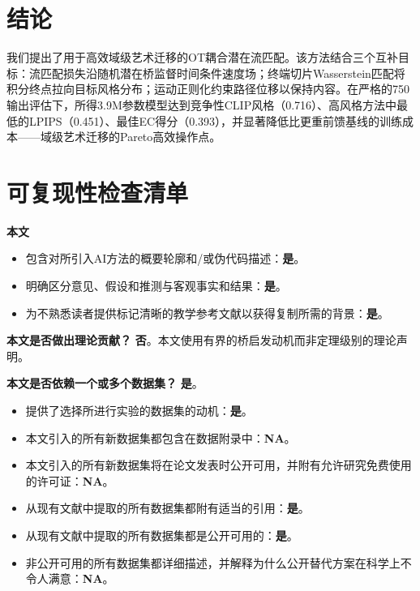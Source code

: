 \documentclass[letterpaper]{article}
\begin{document}
\section{结论}
我们提出了用于高效域级艺术迁移的OT耦合潜在流匹配。该方法结合三个互补目标：流匹配损失沿随机潜在桥监督时间条件速度场；终端切片Wasserstein匹配将积分终点拉向目标风格分布；运动正则化约束路径位移以保持内容。在严格的750输出评估下，所得3.9M参数模型达到竞争性CLIP风格（0.716）、高风格方法中最低的LPIPS（0.451）、最佳EC得分（0.393），并显著降低比更重前馈基线的训练成本——域级艺术迁移的Pareto高效操作点。

\FloatBarrier


\clearpage
\small
\setlength{\itemsep}{1pt}
\setlength{\parskip}{2pt}
\section*{可复现性检查清单}
\noindent\textbf{本文}
\begin{itemize}
\item 包含对所引入AI方法的概要轮廓和/或伪代码描述：\textbf{是}。
\item 明确区分意见、假设和推测与客观事实和结果：\textbf{是}。
\item 为不熟悉读者提供标记清晰的教学参考文献以获得复制所需的背景：\textbf{是}。
\end{itemize}

\noindent\textbf{本文是否做出理论贡献？} \textbf{否}。本文使用有界的桥启发动机而非定理级别的理论声明。

\noindent\textbf{本文是否依赖一个或多个数据集？} \textbf{是}。
\begin{itemize}
\item 提供了选择所进行实验的数据集的动机：\textbf{是}。
\item 本文引入的所有新数据集都包含在数据附录中：\textbf{NA}。
\item 本文引入的所有新数据集将在论文发表时公开可用，并附有允许研究免费使用的许可证：\textbf{NA}。
\item 从现有文献中提取的所有数据集都附有适当的引用：\textbf{是}。
\item 从现有文献中提取的所有数据集都是公开可用的：\textbf{是}。
\item 非公开可用的所有数据集都详细描述，并解释为什么公开替代方案在科学上不令人满意：\textbf{NA}。
\end{itemize}
\end{document}
